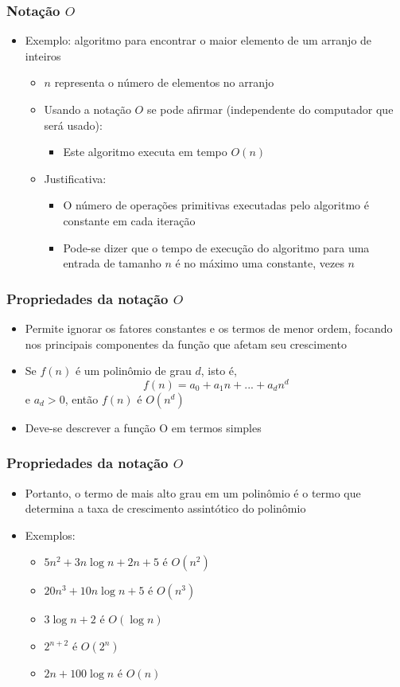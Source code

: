 \documentclass[aspectratio=169]{beamer}
\begin{document}
\begin{frame}\frametitle{Notação $O$}
\begin{itemize}
	\item Exemplo: algoritmo para encontrar o maior elemento de um arranjo de inteiros
	\begin{itemize}
		\item $n$ representa o número de elementos no arranjo
		\item Usando a notação $O$ se pode afirmar (independente do computador que será usado):
		\begin{itemize}
			\item Este algoritmo executa em tempo $O(n)$
		\end{itemize}
		\item Justificativa:
		\begin{itemize}
			\item O número de operações primitivas executadas pelo algoritmo é constante em cada iteração
			\item Pode-se dizer que o tempo de execução do algoritmo para uma entrada de tamanho $n$ é no máximo uma constante, vezes $n$
		\end{itemize}
	\end{itemize}
\end{itemize}
\end{frame}

\begin{frame}\frametitle{Propriedades da notação $O$}
\begin{itemize}
	\item Permite ignorar os fatores constantes e os termos de menor ordem, focando nos principais componentes da função que afetam seu crescimento
	\item Se $f(n)$ é um polinômio de grau $d$, isto é,
\[f(n) = a_0 + a_{1}n + ... + a_{d}n^{d}\]
e $a_d > 0$, então $f(n)$ é $O(n^{d})$
	\item Deve-se descrever a função O em termos simples
\end{itemize}
\end{frame}

\begin{frame}\frametitle{Propriedades da notação $O$}
\begin{itemize}
	\item Portanto, o termo de mais alto grau em um polinômio é o termo que determina a taxa de crescimento assintótico do polinômio
	\item Exemplos:
	\begin{itemize}
		\item $5n^2 + 3n\log{n} + 2n + 5$ é $O(n^2)$
		\item $20n^3 + 10n\log{n} + 5$ é $O(n^3)$
		\item $3\log{n} + 2$ é $O(\log{n})$
		\item $2^{n+2}$ é $O(2^n)$
		\item $2n + 100\log{n}$ é $O(n)$
	\end{itemize}
\end{itemize}
\end{frame}
\end{document}
